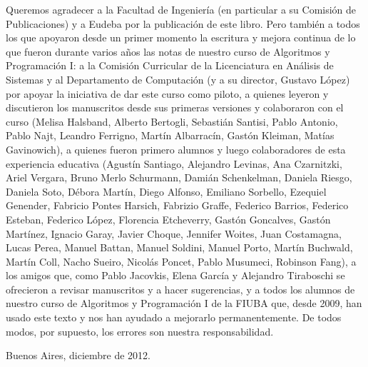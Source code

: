 Queremos agradecer a la Facultad de Ingeniería (en particular a su Comisión de Publicaciones) y a
Eudeba por la publicación de este libro. Pero también a todos los que apoyaron desde un primer momento
la escritura y mejora continua de lo que fueron durante varios años las notas de nuestro curso de
Algoritmos y Programación I: a la Comisión Curricular de la Licenciatura en Análisis de Sistemas y al
Departamento de Computación (y a su director, Gustavo López) por apoyar la iniciativa de dar este curso
como piloto, a quienes leyeron y discutieron los manuscritos desde sus primeras versiones y colaboraron
con el curso (Melisa Halsband, Alberto Bertogli, Sebastián Santisi, Pablo Antonio, Pablo Najt,
Leandro Ferrigno, Martín Albarracín, Gastón Kleiman, Matías Gavinowich), a quienes fueron primero alumnos y
luego colaboradores de esta experiencia educativa
(Agustín Santiago,
Alejandro Levinas,
Ana Czarnitzki,
Ariel Vergara,
Bruno Merlo Schurmann,
Damián Schenkelman,
Daniela Riesgo,
Daniela Soto,
Débora Martín,
Diego Alfonso,
Emiliano Sorbello,
Ezequiel Genender,
Fabricio Pontes Harsich,
Fabrizio Graffe,
Federico Barrios,
Federico Esteban,
Federico López,
Florencia Etcheverry,
Gastón Goncalves,
Gastón Martínez,
Ignacio Garay,
Javier Choque,
Jennifer Woites,
Juan Costamagna,
Lucas Perea,
Manuel Battan,
Manuel Soldini,
Manuel Porto,
Martín Buchwald,
Martín Coll,
Nacho Sueiro,
Nicolás Poncet,
Pablo Musumeci,
Robinson Fang),
a los amigos que, como Pablo Jacovkis, Elena García y Alejandro Tiraboschi se ofrecieron a
revisar manuscritos y a hacer sugerencias, y a todos los alumnos de nuestro curso de Algoritmos y
Programación I de la FIUBA que, desde 2009, han usado este texto y nos han ayudado a mejorarlo permanentemente.
De todos modos, por supuesto, los errores son nuestra responsabilidad.


\hfill Buenos Aires, diciembre de 2012.

